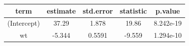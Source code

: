 \documentclass[]{article}
\theoremstyle{definition}
\theoremstyle{definition}
\theoremstyle{definition}
\theoremstyle{remark}
\begin{document}
\begin{longtable}[]{@{}ccccc@{}}
\toprule
\begin{minipage}[b]{0.17\columnwidth}\centering\strut
term\strut
\end{minipage} & \begin{minipage}[b]{0.13\columnwidth}\centering\strut
estimate\strut
\end{minipage} & \begin{minipage}[b]{0.14\columnwidth}\centering\strut
std.error\strut
\end{minipage} & \begin{minipage}[b]{0.14\columnwidth}\centering\strut
statistic\strut
\end{minipage} & \begin{minipage}[b]{0.14\columnwidth}\centering\strut
p.value\strut
\end{minipage}\tabularnewline
\midrule
\endhead
\begin{minipage}[t]{0.17\columnwidth}\centering\strut
(Intercept)\strut
\end{minipage} & \begin{minipage}[t]{0.13\columnwidth}\centering\strut
37.29\strut
\end{minipage} & \begin{minipage}[t]{0.14\columnwidth}\centering\strut
1.878\strut
\end{minipage} & \begin{minipage}[t]{0.14\columnwidth}\centering\strut
19.86\strut
\end{minipage} & \begin{minipage}[t]{0.14\columnwidth}\centering\strut
8.242e-19\strut
\end{minipage}\tabularnewline
\begin{minipage}[t]{0.17\columnwidth}\centering\strut
wt\strut
\end{minipage} & \begin{minipage}[t]{0.13\columnwidth}\centering\strut
-5.344\strut
\end{minipage} & \begin{minipage}[t]{0.14\columnwidth}\centering\strut
0.5591\strut
\end{minipage} & \begin{minipage}[t]{0.14\columnwidth}\centering\strut
-9.559\strut
\end{minipage} & \begin{minipage}[t]{0.14\columnwidth}\centering\strut
1.294e-10\strut
\end{minipage}\tabularnewline
\bottomrule
\end{longtable}
\end{document}
